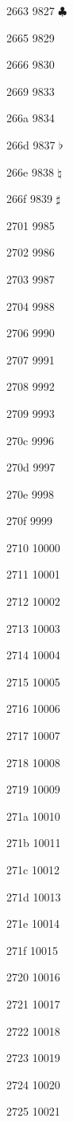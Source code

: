 \documentclass[11pt]{article}
\begin{document}
2663 9827 \ensuremath{\clubsuit}

2665 9829 

2666 9830 

2669 9833 \quarternote

266a 9834 \eighthnote

266d 9837 \ensuremath{\flat}

266e 9838 \ensuremath{\natural}

266f 9839 \ensuremath{\sharp}

2701 9985 

2702 9986 

2703 9987 

2704 9988 

2706 9990 

2707 9991 

2708 9992 

2709 9993 

270c 9996 

270d 9997 

270e 9998 

270f 9999 

2710 10000 

2711 10001 

2712 10002 

2713 10003 \checkmark

2714 10004 

2715 10005 

2716 10006 

2717 10007 

2718 10008 

2719 10009 

271a 10010 

271b 10011 

271c 10012 

271d 10013 

271e 10014 

271f 10015 

2720 10016 \maltese

2721 10017 

2722 10018 

2723 10019 

2724 10020 

2725 10021 
\end{document}
